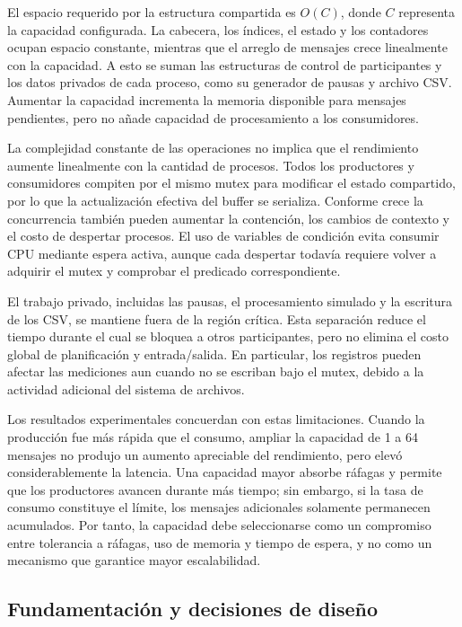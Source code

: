 \documentclass[conference]{IEEEtran}
\begin{document}
El espacio requerido por la estructura compartida es $O(C)$, donde $C$ representa la capacidad configurada. La cabecera, los índices, el estado y los contadores ocupan espacio constante, mientras que el arreglo de mensajes crece linealmente con la capacidad. A esto se suman las estructuras de control de participantes y los datos privados de cada proceso, como su generador de pausas y archivo CSV. Aumentar la capacidad incrementa la memoria disponible para mensajes pendientes, pero no añade capacidad de procesamiento a los consumidores.

La complejidad constante de las operaciones no implica que el rendimiento aumente linealmente con la cantidad de procesos. Todos los productores y consumidores compiten por el mismo mutex para modificar el estado compartido, por lo que la actualización efectiva del buffer se serializa. Conforme crece la concurrencia también pueden aumentar la contención, los cambios de contexto y el costo de despertar procesos. El uso de variables de condición evita consumir CPU mediante espera activa, aunque cada despertar todavía requiere volver a adquirir el mutex y comprobar el predicado correspondiente.

El trabajo privado, incluidas las pausas, el procesamiento simulado y la escritura de los CSV, se mantiene fuera de la región crítica. Esta separación reduce el tiempo durante el cual se bloquea a otros participantes, pero no elimina el costo global de planificación y entrada/salida. En particular, los registros pueden afectar las mediciones aun cuando no se escriban bajo el mutex, debido a la actividad adicional del sistema de archivos.

Los resultados experimentales concuerdan con estas limitaciones. Cuando la producción fue más rápida que el consumo, ampliar la capacidad de 1 a 64 mensajes no produjo un aumento apreciable del rendimiento, pero elevó considerablemente la latencia. Una capacidad mayor absorbe ráfagas y permite que los productores avancen durante más tiempo; sin embargo, si la tasa de consumo constituye el límite, los mensajes adicionales solamente permanecen acumulados. Por tanto, la capacidad debe seleccionarse como un compromiso entre tolerancia a ráfagas, uso de memoria y tiempo de espera, y no como un mecanismo que garantice mayor escalabilidad.


\subsection{Fundamentación y decisiones de diseño}
\end{document}
